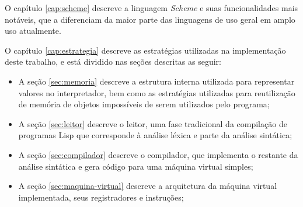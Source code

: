 O capítulo \ref{cap:scheme} descreve a linguagem \textit{Scheme} e suas
funcionalidades mais notáveis, que a diferenciam da maior parte das linguagens
de uso geral em amplo uso atualmente.

O capítulo \ref{cap:estrategia} descreve as estratégias utilizadas na
implementação deste trabalho, e está dividido nas seções descritas as seguir:

\begin{itemize}

\item A seção \ref{sec:memoria} descreve a estrutura interna utilizada para
representar valores no interpretador, bem como as estratégias utilizadas para
reutilização de memória de objetos impossíveis de serem utilizados pelo
programa;

\item A seção \ref{sec:leitor} descreve o leitor, uma fase tradicional da
compilação de programas Lisp que corresponde à análise léxica e parte da
análise sintática;

\item A seção \ref{sec:compilador} descreve o compilador, que implementa o
restante da análise sintática e gera código para uma máquina virtual simples;

\item A seção \ref{sec:maquina-virtual} descreve a arquitetura da máquina
virtual implementada, seus registradores e instruções;


\end{itemize}

